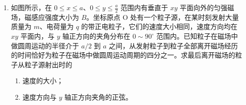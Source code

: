 \documentclass[\gkver]{gaokaozhenti}
\begin{document}
\begin{enumerate}
{$\frac{1}{2}vt+v(9.69-0.15-t)=100$，

$\frac{1}{2}vt+0.96v(19.30-0.15-t)=200$。

联立解得：$t=1.29\Us$，$v=11.24\Ums$。

（2）设起跑后做匀加速运动的加速度为 $a$，则 $a=\frac{v}{t}=\frac{11.24}{1.29}\Umsq=8.71\Umsq$。
}

\item
如图所示，在 $0\leq x\leq a$、$0\leq y\leq\frac{a}{2}$ 范围内有垂直于 $xy$ 平面向外的匀强磁场，磁感应强度大小为 $B$。坐标原点 O 处有一个粒子源，在某时刻发射大量质量为 $m$、电荷量为 $q$ 的带正电粒子，它们的速度大小相同，速度方向均在 $xy$ 平面内，与 $y$ 轴正方向的夹角分布在 $0\sim90^{\circ}$ 范围内。已知粒子在磁场中做圆周运动的半径介于 $a/2$ 到 $a$ 之间，从发射粒子到粒子全部离开磁场经历的时间恰好为粒子在磁场中做圆周运动周期的四分之一。求最后离开磁场的粒子从粒子源射出时的
\begin{enumerate}
	\item
	速度的大小；
	\item
	速度方向与 $y$ 轴正方向夹角的正弦。
\end{enumerate}
\end{enumerate}
\end{document}
